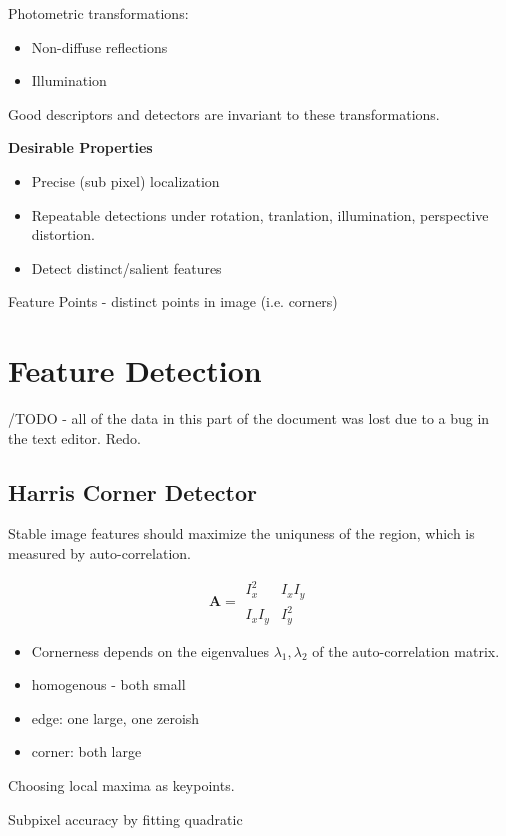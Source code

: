 Photometric transformations:
\begin{itemize}
\item Non-diffuse reflections 
\item Illumination
\end{itemize}

Good descriptors and detectors are invariant to these transformations. 

\textbf{Desirable Properties}
\begin{itemize} 
\item Precise (sub pixel) localization
\item Repeatable detections under rotation, tranlation, illumination, perspective distortion.
\item Detect distinct/salient features
\end{itemize}

Feature Points - distinct points in image (i.e. corners)

\section{Feature Detection}

/TODO - all of the data in this part of the document was lost due to a bug in the text editor. Redo.

\subsection{Harris Corner Detector}

Stable image features should maximize the uniquness of the region, which is measured by auto-correlation.

$$ 
\mathbf{A} =  \begin{matrix} I_x^2 &  I_xI_y \\
I_xI_y & I_y^2
\end{matrix} $$

\begin{itemize}
\item Cornerness depends on the eigenvalues $\lambda_1,\lambda_2$ of the auto-correlation matrix.
\item homogenous - both small
\item edge: one large, one zeroish
\item corner: both large
\end{itemize}

Choosing local maxima as keypoints. 

Subpixel accuracy by fitting quadratic 

